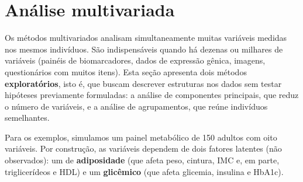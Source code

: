 \documentclass[
]{book}
\begin{document}
\section{Análise multivariada}\label{anuxe1lise-multivariada}

Os métodos multivariados analisam simultaneamente muitas variáveis medidas nos mesmos indivíduos. São indispensáveis quando há dezenas ou milhares de variáveis (painéis de biomarcadores, dados de expressão gênica, imagens, questionários com muitos itens). Esta seção apresenta dois métodos \textbf{exploratórios}, isto é, que buscam descrever estruturas nos dados sem testar hipóteses previamente formuladas: a análise de componentes principais, que reduz o número de variáveis, e a análise de agrupamentos, que reúne indivíduos semelhantes.

Para os exemplos, simulamos um painel metabólico de 150 adultos com oito variáveis. Por construção, as variáveis dependem de dois fatores latentes (não observados): um de \textbf{adiposidade} (que afeta peso, cintura, IMC e, em parte, triglicerídeos e HDL) e um \textbf{glicêmico} (que afeta glicemia, insulina e HbA1c).
\end{document}
